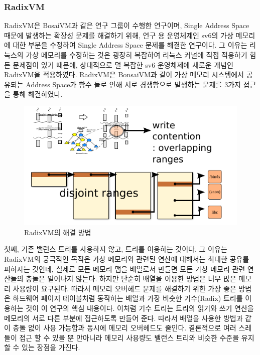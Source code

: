 
\subsubsection{RadixVM}

RadixVM은 BosaiVM과 같은 연구 그룹이 수행한 연구이며, 
Single Address Space 때문에 발생하는 확장성 문제를 해결하기 위해, 연구 용 운영체제인 sv6의 가상 메모리에 
대한 부분을 수정하여 Single Address Space 문제를 해결한 연구이다.
그 이유는 리눅스의 가상 메모리를 수정하는 것은 굉장히 복잡하여 리눅스 커널에 직접 적용하기 힘든 문제점이 
있기 때문에, 상대적으로 덜 복잡한 sv6 운영체제에 새로운 개념인 RadixVM을 적용하였다. 
RadixVM은 BonsaiVM과 같이 가상 메모리 시스템에서 공유되는 Address Space가  함수 들로 인해 서로 경쟁함으로 발생하는 문제를 3가지 접근을 통해 해결하였다. 

\begin{figure}[h!]
    \centering
    \includegraphics[width=1\textwidth]{fig/radix/radix}
    \caption{RadixVM의 해결 방법}
  \label{fig:radix}
\end{figure}

첫째, 기존 밸런스 트리를 사용하지 않고,  트리를 이용하는 것이다. 
그 이유는 RadixVM의 궁극적인 목적은 가상 메모리와 관련된 연산에 대해서는 최대한 공유를 피하자는 것인데, 
실제로 모든 메모리 맵을 배열로서 만들면 모든 가상 메모리 관련 연산들의 충돌은 일어나지 않는다. 
하지만 단순히 배열을 이용한 방법은 너무 많은 메모리 사용량이 요구된다.
따라서 메모리 오버헤드 문제를 해결하기 위한 가장 좋은 방법은 하드웨어 페이지 테이블처럼 동작하는 
배열과 가장 비슷한 기수(Radix) 트리를 이용하는 것이 이 연구의 핵심 내용이다. 
이처럼 기수 트리는 트리의 읽기와 쓰기 연산을 메모리의 서로 다른 부분에 접근하도록 만들어 준다.
따라서 배열을 사용한 방법과 같이 충돌 없이 사용 가능함과 동시에 메모리 오버헤드도 줄인다. 
결론적으로 여러 스레들이 접근 할 수 있을 뿐 만아니라 메모리 사용량도 밸런스 트리와 비슷한 
수준을 유지 할 수 있는 장점을 가진다.

